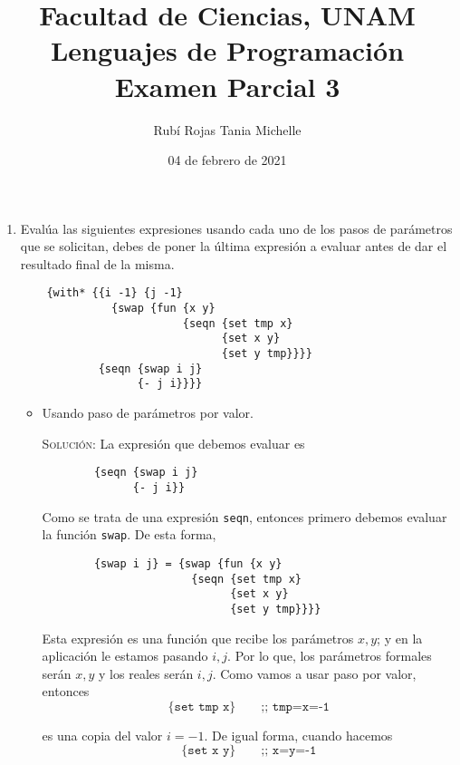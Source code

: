 \documentclass[letterpaper,11pt]{article}
\title{Facultad de Ciencias, UNAM \\ 
       Lenguajes de Programación\\ 
       Examen Parcial 3}
\author{Rubí Rojas Tania Michelle}
\date{04 de febrero de 2021}
\begin{document}
\maketitle

\begin{enumerate}
    \item Evalúa las siguientes expresiones usando cada uno de los pasos de 
    parámetros que se solicitan, debes de poner la última expresión a evaluar
    antes de dar el resultado final de la misma.
    \begin{verbatim}
    {with* {{i -1} {j -1}
              {swap {fun {x y}
                         {seqn {set tmp x}
                               {set x y}
                               {set y tmp}}}}
            {seqn {swap i j}
                  {- j i}}}}
    \end{verbatim}

    \begin{itemize}
        \item Usando paso de parámetros por valor.
        
        \textsc{Solución:} La expresión que debemos evaluar es 
        \begin{verbatim}
        {seqn {swap i j} 
              {- j i}}
        \end{verbatim}

        Como se trata de una expresión \texttt{seqn}, entonces primero 
        debemos evaluar la función \texttt{swap}. De esta forma,  
        \begin{verbatim}
        {swap i j} = {swap {fun {x y}
                       {seqn {set tmp x}
                             {set x y}
                             {set y tmp}}}}
        \end{verbatim}

        Esta expresión es una función que recibe los parámetros $x,y$; y en 
        la aplicación le estamos pasando $i,j$. Por lo que, los parámetros 
        formales serán $x,y$ y los reales serán $i,j$. Como vamos a usar 
        paso por valor, entonces
        \begin{equation*}
            \texttt{\{set tmp x\}} \quad \quad \texttt{;; tmp=x=-1}
        \end{equation*} 
        
        es una copia del valor $i=-1$. De igual forma, cuando hacemos
        \begin{equation*}
            \texttt{\{set x y\}} \quad \quad \texttt{;; x=y=-1}
        \end{equation*}
        

\end{itemize}
\end{enumerate}
\end{document}
